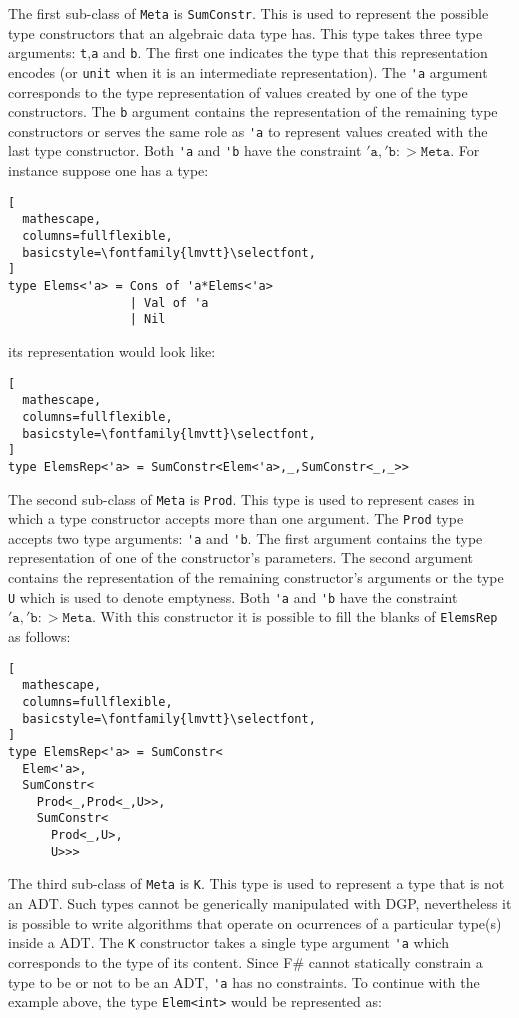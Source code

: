 \documentclass{sigplanconf}
\begin{document}
The first sub-class of \verb+Meta+ is \verb+SumConstr+. This is used to represent the possible type constructors that an algebraic data type has. This type takes three type arguments: \verb+t+,\verb+a+ and \verb+b+. The first one indicates the type that this representation encodes (or \verb+unit+ when it is an intermediate representation). The \verb+'a+ argument corresponds to the type representation of values created by one of the type constructors. The \verb+b+ argument contains the representation of the remaining type constructors or serves the same role as \verb+'a+ to represent values created with the last type constructor. Both \verb+'a+ and \verb+'b+ have the constraint $\mathtt{'a},\mathtt{'b} :> \mathtt{Meta}$. For instance suppose one has a type:
\begin{lstlisting}[
  mathescape,
  columns=fullflexible,
  basicstyle=\fontfamily{lmvtt}\selectfont,
]
type Elems<'a> = Cons of 'a*Elems<'a> 
                 | Val of 'a 
                 | Nil 
\end{lstlisting}
its representation would look like:
\begin{lstlisting}[
  mathescape,
  columns=fullflexible,
  basicstyle=\fontfamily{lmvtt}\selectfont,
]
type ElemsRep<'a> = SumConstr<Elem<'a>,_,SumConstr<_,_>>
\end{lstlisting}
The second sub-class of \verb+Meta+ is \verb+Prod+. This type is used to represent cases in which a type constructor accepts more than one argument. The \verb+Prod+ type accepts two type arguments: \verb+'a+ and \verb+'b+. The first argument contains the type representation of one of the constructor's parameters. The second argument contains the representation of the remaining constructor's arguments or the type \verb+U+ which is used to denote emptyness. Both \verb+'a+ and \verb+'b+ have the constraint $\mathtt{'a},\mathtt{'b} :> \mathtt{Meta}$. With this constructor it is possible to fill the blanks of \verb+ElemsRep+ as follows:
\begin{lstlisting}[
  mathescape,
  columns=fullflexible,
  basicstyle=\fontfamily{lmvtt}\selectfont,
]
type ElemsRep<'a> = SumConstr<
  Elem<'a>,
  SumConstr<
    Prod<_,Prod<_,U>>,
    SumConstr<
      Prod<_,U>,
      U>>>
\end{lstlisting}
The third sub-class of \verb+Meta+ is \verb+K+. This type is used to represent a type that is not an ADT. Such types cannot be generically manipulated with DGP, nevertheless it is possible to write algorithms that operate on ocurrences of a particular type(s) inside a ADT. The \verb+K+ constructor takes a single type argument \verb+'a+ which corresponds to the type of its content. Since F\# cannot statically constrain a type to be or not to be an ADT, \verb+'a+ has no constraints. To continue with the example above, the type \verb+Elem<int>+ would be represented as:
\end{document}

